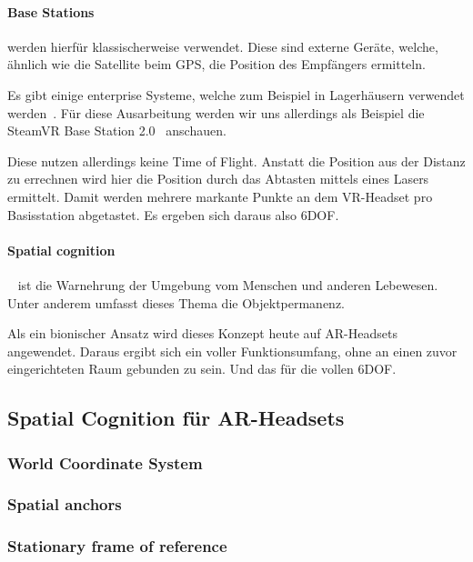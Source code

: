 \paragraph{Base Stations}\label{par:base-stations} werden hierfür klassischerweise verwendet.
Diese sind externe Geräte, welche, ähnlich wie die Satellite beim GPS, die Position des Empfängers ermitteln.

Es gibt einige enterprise Systeme, welche zum Beispiel in Lagerhäusern verwendet werden~\autocite{wikipedia-contributors-2023D}.
Für diese Ausarbeitung werden wir uns allerdings als Beispiel die SteamVR Base Station 2.0~\autocite{unknown-author-no-date} anschauen.

Diese nutzen allerdings keine Time of Flight.
Anstatt die Position aus der Distanz zu errechnen wird hier die Position durch das Abtasten mittels eines Lasers ermittelt.
Damit werden mehrere markante Punkte an dem VR-Headset pro Basisstation abgetastet.
Es ergeben sich daraus also 6DOF\@.

\paragraph{Spatial cognition}~\autocite{wikipedia-contributors-2023E} ist die Warnehrung der Umgebung vom Menschen und anderen Lebewesen.
Unter anderem umfasst dieses Thema die Objektpermanenz.

Als ein bionischer Ansatz wird dieses Konzept heute auf AR-Headsets angewendet.
Daraus ergibt sich ein voller Funktionsumfang, ohne an einen zuvor eingerichteten Raum gebunden zu sein.
Und das für die vollen 6DOF\@.

\subsection{Spatial Cognition für AR-Headsets}\label{subsec:spatial-cognition-fur-ar-headsets}
\subsubsection{World Coordinate System}
\subsubsection{Spatial anchors}
\subsubsection{Stationary frame of reference}
